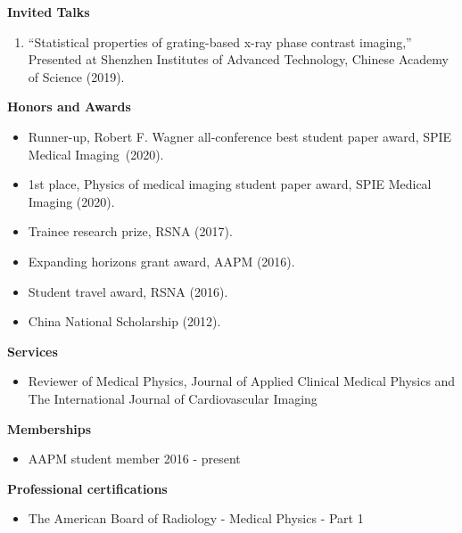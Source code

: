 \documentclass[letterpaper,11pt]{article}
\newcommand{\resheading}[1]{{\large \colorbox{mygrey}{\begin{minipage}{\textwidth}{\textbf{#1 \vphantom{p\^{E}}}}\end{minipage}}}}
\begin{document}
\resheading {Invited Talks}
\begin{enumerate}\justifying
\item ``Statistical properties of grating-based x-ray phase contrast imaging,'' Presented at Shenzhen Institutes of Advanced Technology, Chinese Academy of Science (2019).
\end{enumerate}
\resheading{{Honors and Awards}}
\begin{itemize}\justifying
\item Runner-up, Robert F. Wagner all-conference best student paper award, SPIE Medical Imaging~(2020).
\item 1st place, Physics of medical imaging student paper award, SPIE Medical Imaging (2020).
\item Trainee research prize, RSNA (2017).
\item Expanding horizons grant award, AAPM (2016).
\item Student travel award, RSNA (2016).
\item China National Scholarship (2012).
\end{itemize}
\resheading{Services}
\begin{itemize}
\item Reviewer of Medical Physics, Journal of Applied Clinical Medical Physics and The International Journal of Cardiovascular Imaging
\end{itemize}
\resheading{Memberships}
\begin{itemize}
\item AAPM student member \cftdotfill{\cftdotsep} 2016 - present
\end{itemize}
\resheading{Professional certifications}
\begin{itemize}
\item The American Board of Radiology - Medical Physics - Part 1
\end{itemize}
\end{document}
